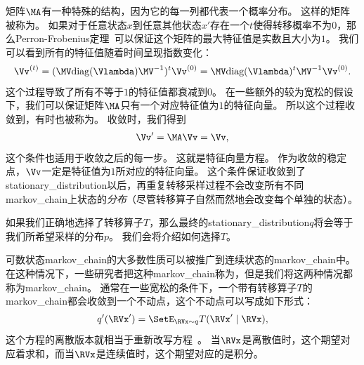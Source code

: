 矩阵$\MA$有一种特殊的结构，因为它的每一列都代表一个概率分布。
这样的矩阵被称为。
如果对于任意状态$x$到任意其他状态$x'$存在一个$t$使得转移概率不为$0$，那么Perron-Frobenius定理~\citep{perron1907theorie,frobenius1908matrizen}可以保证这个矩阵的最大特征值是实数且大小为$1$。
我们可以看到所有的特征值随着时间呈现指数变化： 
\begin{align}
\Vv^{(t)} = (\MV \text{diag}(\Vlambda)\MV^{-1})^{t} \Vv^{(0)} = \MV \text{diag}(\Vlambda)^t \MV^{-1} \Vv^{(0)}.
\end{align}
这个过程导致了所有不等于$1$的特征值都衰减到$0$。  
在一些额外的较为宽松的假设下，我们可以保证矩阵$\MA$只有一个对应特征值为$1$的特征向量。  
所以这个过程收敛到，有时也被称为。 
收敛时，我们得到 
\begin{align}
\label{eqn:1723}
\Vv ' = \MA \Vv = \Vv,
\end{align}
这个条件也适用于收敛之后的每一步。
这就是特征向量方程。
作为收敛的稳定点，$\Vv$一定是特征值为$1$所对应的特征向量。 
这个条件保证收敛到了\gls{stationary_distribution}以后，再重复转移采样过程不会改变所有不同\gls{markov_chain}上状态的\emph{分布}（尽管转移算子自然而然地会改变每个单独的状态）。  


如果我们正确地选择了转移算子$T$，那么最终的\gls{stationary_distribution}$q$将会等于我们所希望采样的分布$p$。  
我们会将介绍如何选择$T$。 


可数状态\gls{markov_chain}的大多数性质可以被推广到连续状态的\gls{markov_chain}中。 
在这种情况下，一些研究者把这种\gls{markov_chain}称为，但是我们将这两种情况都称为\gls{markov_chain}。
通常在一些宽松的条件下，一个带有转移算子$T$的\gls{markov_chain}都会收敛到一个不动点，这个不动点可以写成如下形式：
\begin{align}
q' (\RVx') = \SetE_{\RVx\sim q}T(\RVx'\mid \RVx),
\end{align}
这个方程的离散版本就相当于重新改写方程~。
当$\RVx$是离散值时，这个期望对应着求和，而当$\RVx$是连续值时，这个期望对应的是积分。 


